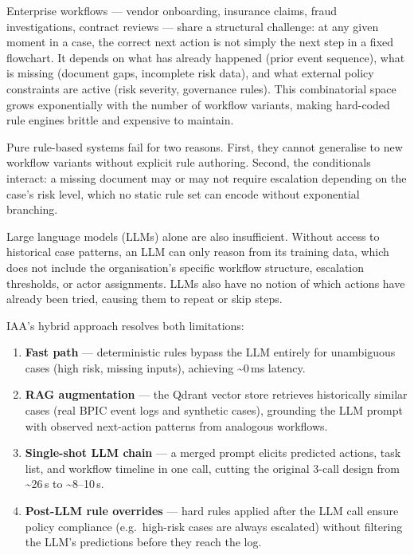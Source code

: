 \documentclass[12pt,a4paper]{article}
\begin{document}
Enterprise workflows --- vendor onboarding, insurance claims, fraud investigations,
contract reviews --- share a structural challenge: at any given moment in a case,
the correct next action is not simply the next step in a fixed flowchart.
It depends on what has already happened (prior event sequence), what is missing
(document gaps, incomplete risk data), and what external policy constraints are active
(risk severity, governance rules). This combinatorial space grows exponentially with
the number of workflow variants, making hard-coded rule engines brittle and expensive to maintain.

Pure rule-based systems fail for two reasons. First, they cannot generalise to new
workflow variants without explicit rule authoring. Second, the conditionals interact:
a missing document may or may not require escalation depending on the case's risk level,
which no static rule set can encode without exponential branching.

Large language models (LLMs) alone are also insufficient. Without access to
historical case patterns, an LLM can only reason from its training data, which does not
include the organisation's specific workflow structure, escalation thresholds, or
actor assignments. LLMs also have no notion of which actions have already been tried,
causing them to repeat or skip steps.

IAA's hybrid approach resolves both limitations:
\begin{enumerate}[nosep]
  \item \textbf{Fast path} --- deterministic rules bypass the LLM entirely for
    unambiguous cases (high risk, missing inputs), achieving \textasciitilde{}0\,ms latency.
  \item \textbf{RAG augmentation} --- the Qdrant vector store retrieves historically
    similar cases (real BPIC event logs and synthetic cases), grounding the LLM prompt
    with observed next-action patterns from analogous workflows.
  \item \textbf{Single-shot LLM chain} --- a merged prompt elicits predicted actions,
    task list, and workflow timeline in one call, cutting the original 3-call design
    from \textasciitilde{}26\,s to \textasciitilde{}8--10\,s.
  \item \textbf{Post-LLM rule overrides} --- hard rules applied after the LLM call
    ensure policy compliance (e.g.\ high-risk cases are always escalated) without
    filtering the LLM's predictions before they reach the log.
\end{enumerate}
\end{document}
